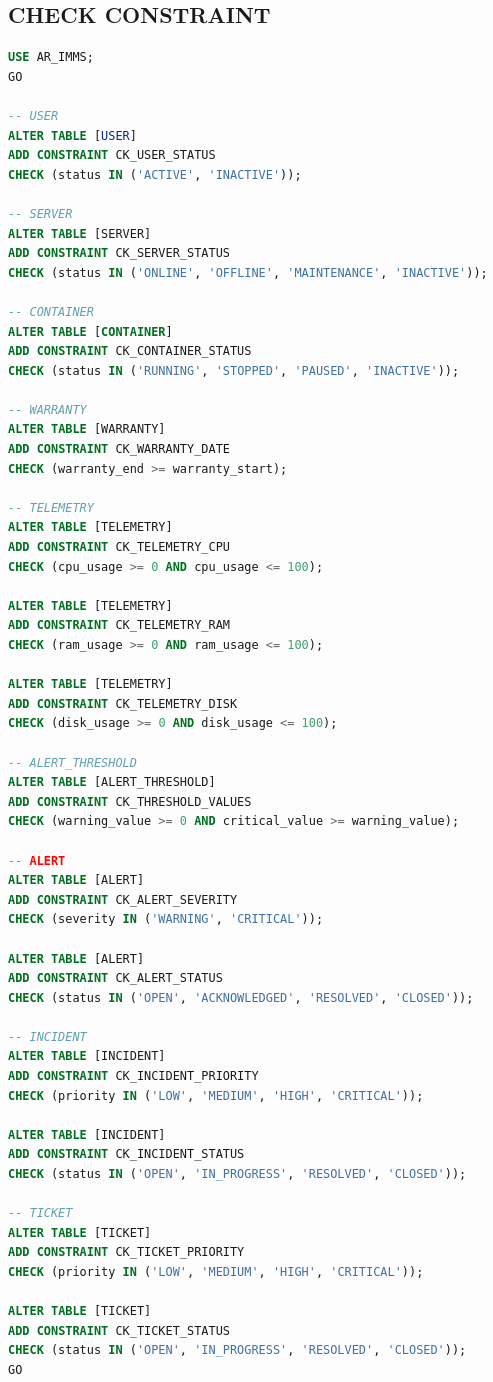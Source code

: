 \subsection{CHECK CONSTRAINT}
\begin{lstlisting}[language=SQL]
USE AR_IMMS;
GO

-- USER
ALTER TABLE [USER]
ADD CONSTRAINT CK_USER_STATUS
CHECK (status IN ('ACTIVE', 'INACTIVE'));

-- SERVER
ALTER TABLE [SERVER]
ADD CONSTRAINT CK_SERVER_STATUS
CHECK (status IN ('ONLINE', 'OFFLINE', 'MAINTENANCE', 'INACTIVE'));

-- CONTAINER
ALTER TABLE [CONTAINER]
ADD CONSTRAINT CK_CONTAINER_STATUS
CHECK (status IN ('RUNNING', 'STOPPED', 'PAUSED', 'INACTIVE'));

-- WARRANTY
ALTER TABLE [WARRANTY]
ADD CONSTRAINT CK_WARRANTY_DATE
CHECK (warranty_end >= warranty_start);

-- TELEMETRY
ALTER TABLE [TELEMETRY]
ADD CONSTRAINT CK_TELEMETRY_CPU
CHECK (cpu_usage >= 0 AND cpu_usage <= 100);

ALTER TABLE [TELEMETRY]
ADD CONSTRAINT CK_TELEMETRY_RAM
CHECK (ram_usage >= 0 AND ram_usage <= 100);

ALTER TABLE [TELEMETRY]
ADD CONSTRAINT CK_TELEMETRY_DISK
CHECK (disk_usage >= 0 AND disk_usage <= 100);

-- ALERT_THRESHOLD
ALTER TABLE [ALERT_THRESHOLD]
ADD CONSTRAINT CK_THRESHOLD_VALUES
CHECK (warning_value >= 0 AND critical_value >= warning_value);

-- ALERT
ALTER TABLE [ALERT]
ADD CONSTRAINT CK_ALERT_SEVERITY
CHECK (severity IN ('WARNING', 'CRITICAL'));

ALTER TABLE [ALERT]
ADD CONSTRAINT CK_ALERT_STATUS
CHECK (status IN ('OPEN', 'ACKNOWLEDGED', 'RESOLVED', 'CLOSED'));

-- INCIDENT
ALTER TABLE [INCIDENT]
ADD CONSTRAINT CK_INCIDENT_PRIORITY
CHECK (priority IN ('LOW', 'MEDIUM', 'HIGH', 'CRITICAL'));

ALTER TABLE [INCIDENT]
ADD CONSTRAINT CK_INCIDENT_STATUS
CHECK (status IN ('OPEN', 'IN_PROGRESS', 'RESOLVED', 'CLOSED'));

-- TICKET
ALTER TABLE [TICKET]
ADD CONSTRAINT CK_TICKET_PRIORITY
CHECK (priority IN ('LOW', 'MEDIUM', 'HIGH', 'CRITICAL'));

ALTER TABLE [TICKET]
ADD CONSTRAINT CK_TICKET_STATUS
CHECK (status IN ('OPEN', 'IN_PROGRESS', 'RESOLVED', 'CLOSED'));
GO
\end{lstlisting}

